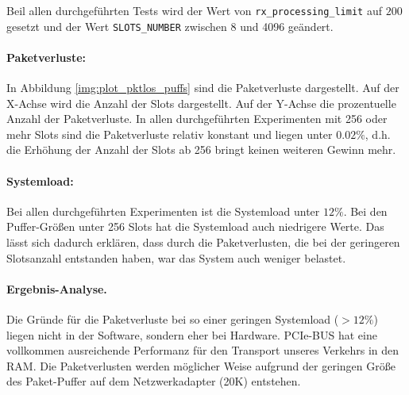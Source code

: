 %
Beil allen durchgeführten Tests wird der Wert von \verb+rx_processing_limit+
auf $200$ gesetzt und der Wert \verb+SLOTS_NUMBER+ zwischen 8 und 4096
geändert. 
% 
\paragraph*{Paketverluste:}
In Abbildung \ref{img:plot_pktlos_puffs} sind die Paketverluste dargestellt.
Auf der X-Achse wird die Anzahl der Slots dargestellt. Auf der Y-Achse die
prozentuelle Anzahl der Paketverluste.  In allen durchgeführten Experimenten
mit 256 oder mehr Slots sind die Paketverluste relativ konstant und liegen
unter $0.02\%$, d.h. die Erhöhung der Anzahl der Slots ab 256 bringt keinen
weiteren Gewinn mehr. 

\paragraph*{Systemload:}
Bei allen durchgeführten Experimenten ist die Systemload unter $12\%$. Bei den
Puffer-Größen unter 256 Slots hat die Systemload auch niedrigere Werte. Das
lässt sich dadurch erklären, dass durch die Paketverlusten, die bei der
geringeren Slotsanzahl entstanden haben, war das System auch weniger belastet.

\paragraph*{Ergebnis-Analyse.}
Die Gründe für die Paketverluste bei so einer geringen Systemload ($>12\%$)
liegen nicht in der Software, sondern eher bei Hardware.  PCIe-BUS hat eine
vollkommen ausreichende Performanz für den Transport unseres Verkehrs in den
RAM. Die Paketverlusten werden möglicher Weise aufgrund der geringen Größe des
Paket-Puffer auf dem Netzwerkadapter (20K) entstehen. 
%
